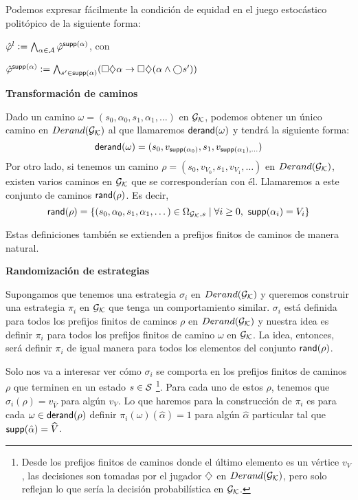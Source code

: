 Podemos expresar fácilmente la condición de equidad en el juego estocástico
politópico de la siguiente forma:

\begin{center}
	$
		\hat \varphi^l := \bigwedge_{\alpha \in \mathcal{A}} \hat \varphi^{\textsf{supp}(\alpha)}
	$, con

	$
		\hat \varphi^{\textsf{supp}(\alpha)} := \bigwedge_{s' \in \textsf{supp}(\alpha)} (\square \diamondsuit \alpha \rightarrow \square \diamondsuit (\alpha \wedge \bigcirc s' ))
	$
\end{center}


\textbf{Transformación de caminos}

Dado un camino $\omega = (s_0, \alpha_0, s_1, \alpha_1, \dots)$ en $\mathcal{G}_{\mathcal{K}}$,
podemos obtener un único camino en $Derand(\mathcal{G}_{\mathcal{K}})$ al que llamaremos $\textsf{derand}(\omega)$ y
tendrá la siguiente forma: $$\textsf{derand}(\omega) = (s_0, v_{\textsf{supp}(\alpha_0)}, s_1,
	v_{\textsf{supp}(\alpha_1), \dots})$$ Por otro lado, si tenemos un camino $\rho = (s_0,
	v_{V_0}, s_1, v_{V_1}, \dots)$ en $Derand(\mathcal{G}_{\mathcal{K}})$, existen varios caminos en $\mathcal{G}_{\mathcal{K}}$ que
se corresponderían con él. Llamaremos a este conjunto de caminos $\textsf{rand}(\rho)$.
Es decir, $$\textsf{rand}(\rho) = \{(s_0, \alpha_0, s_1, \alpha_1, \dots) \in
	\Omega_{\mathcal{G}_{\mathcal{K}},s} \mid \forall i \geq 0, \ \textsf{supp}(\alpha_i) = V_i\}$$

Estas definiciones también se extienden a prefijos finitos de caminos de manera
natural.

\textbf{Randomización de estrategias}

Supongamos que tenemos una estrategia $\sigma_i$ en $Derand(\mathcal{G}_{\mathcal{K}})$ y queremos construir
una estrategia $\pi_i$ en $\mathcal{G}_{\mathcal{K}}$ que tenga un comportamiento similar. $\sigma_i$
está definida para todos los prefijos finitos de caminos $\rho$ en $Derand(\mathcal{G}_{\mathcal{K}})$ y
nuestra idea es definir $\pi_i$ para todos los prefijos finitos de camino
$\omega$ en $\mathcal{G}_{\mathcal{K}}$. La idea, entonces, será definir $\pi_i$ de igual manera para
todos los elementos del conjunto $\textsf{rand}(\rho)$.

Solo nos va a interesar ver cómo $\sigma_i$ se comporta en los prefijos finitos
de caminos $\rho$ que terminen en un estado $s \in \mathcal{S}$ \footnote{Desde los
	prefijos finitos de caminos donde el último elemento es un vértice $v_V$, las
	decisiones son tomadas por el jugador $\diamondsuit$ en $Derand(\mathcal{G}_{\mathcal{K}})$, pero solo reflejan lo
	que sería la decisión probabilística en $\mathcal{G}_{\mathcal{K}}$.}. Para cada uno de estos $\rho$,
tenemos que $\sigma_i(\rho) = v_{\widehat{V}}$ para algún $v_V$. Lo que haremos
para la construcción de $\pi_i$ es para cada $\omega \in \textsf{derand}(\rho)$ definir
$\pi_i(\omega)(\hat\alpha) = 1$ para algún $\hat\alpha$ particular tal que
$\textsf{supp}(\hat\alpha) = \widehat{V}$.

